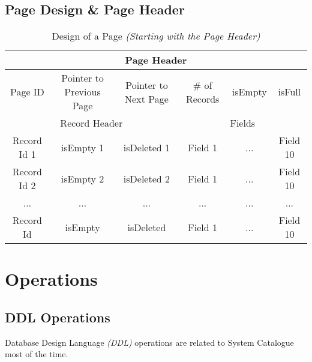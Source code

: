 \documentclass{article}
\newcounter{late}
\begin{document}
    \subsection{Page Design \& Page Header}
                \begin{table}[h!]
                \begin{center}
                \begin{tabular}{ | c | c | c | c | c | c |}
                \hline
                    \multicolumn{6}{|c|}{Page Header} \\
                \hline
                \hline
                    \multicolumn{1}{|c|}{Page ID} &
                    \multicolumn{1}{|c|}{Pointer to Previous Page} &
                    \multicolumn{1}{|c|}{Pointer to Next Page} &
                    \multicolumn{1}{|c|}{\# of Records} &
                    \multicolumn{1}{|c|}{isEmpty} &
                    \multicolumn{1}{|c|}{isFull} \\
                \hline
                \hline
                    \multicolumn{3}{|c|}{Record Header} &
                    \multicolumn{3}{|c|}{Fields} \\
                \hline
                \hline
                Record Id 1 & isEmpty 1 & isDeleted 1 & Field 1  & ... & Field 10 \\
                \hline
                Record Id 2 & isEmpty 2 & isDeleted 2 & Field 1 & ... & Field 10 \\
                \hline
                ...  & ... & ... & ... & ...  & ...  \\
                \hline
                Record Id  & isEmpty  & isDeleted  & Field 1  & ... & Field 10 \\
                \hline
                \end{tabular}
            \end{center}
    \caption{Design of a Page \emph{(Starting with the Page Header)}}
    \label{table:1}
    \end{table}
    
\newpage
\section{Operations}
    \subsection{DDL Operations}
        Database Design Language \emph{(DDL)} operations are related to System Catalogue most of the time.
\end{document}
